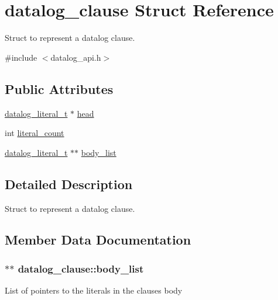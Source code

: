 \hypertarget{structdatalog__clause}{}\section{datalog\+\_\+clause Struct Reference}
\label{structdatalog__clause}


Struct to represent a datalog clause.  




{\ttfamily \#include $<$datalog\+\_\+api.\+h$>$}

\subsection*{Public Attributes}
\begin{DoxyCompactItemize}
\item 
\hyperlink{datalog__api_8h_aeb86f46db4f8142eeb397d20f69f6487}{datalog\+\_\+literal\+\_\+t} $\ast$ \hyperlink{structdatalog__clause_a76efe58a26d93f778904a8ab8f7e12d6}{head}
\item 
int \hyperlink{structdatalog__clause_abcd26a3624b9be0f775ca0828bb2deb9}{literal\+\_\+count}
\item 
\hyperlink{datalog__api_8h_aeb86f46db4f8142eeb397d20f69f6487}{datalog\+\_\+literal\+\_\+t} $\ast$$\ast$ \hyperlink{structdatalog__clause_abe6251f128a0a671904372837405b66a}{body\+\_\+list}
\end{DoxyCompactItemize}


\subsection{Detailed Description}
Struct to represent a datalog clause. 

\subsection{Member Data Documentation}
\subsubsection[{\texorpdfstring{body\+\_\+list}{body_list}}]{$\ast$$\ast$ datalog\+\_\+clause\+::body\+\_\+list}\hypertarget{structdatalog__clause_abe6251f128a0a671904372837405b66a}{}\label{structdatalog__clause_abe6251f128a0a671904372837405b66a}
List of pointers to the literals in the clause\textquotesingle{}s body 
